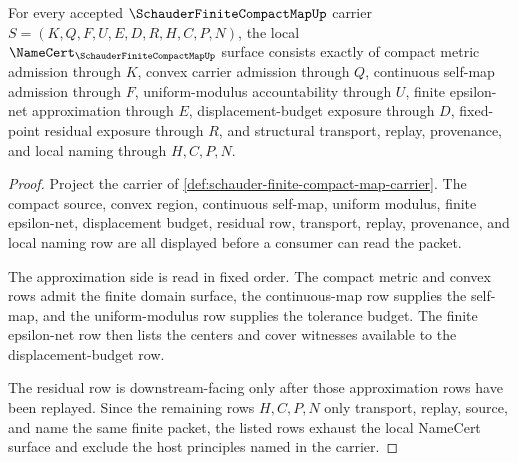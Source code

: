 \begin{theorem}
\label{thm:schauder-finite-compact-map-namecert-obligations}
For every accepted $\SchauderFiniteCompactMapUp$ carrier $S=(K,Q,F,U,E,D,R,H,C,P,N)$, the local $\NameCert_{\SchauderFiniteCompactMapUp}$ surface consists exactly of compact metric admission through $K$, convex carrier admission through $Q$, continuous self-map admission through $F$, uniform-modulus accountability through $U$, finite epsilon-net approximation through $E$, displacement-budget exposure through $D$, fixed-point residual exposure through $R$, and structural transport, replay, provenance, and local naming through $H,C,P,N$.
\end{theorem}
\begin{proof}
Project the carrier of \autoref{def:schauder-finite-compact-map-carrier}. The compact source, convex region, continuous self-map, uniform modulus, finite epsilon-net, displacement budget, residual row, transport, replay, provenance, and local naming row are all displayed before a consumer can read the packet.

The approximation side is read in fixed order. The compact metric and convex rows admit the finite domain surface, the continuous-map row supplies the self-map, and the uniform-modulus row supplies the tolerance budget. The finite epsilon-net row then lists the centers and cover witnesses available to the displacement-budget row.

The residual row is downstream-facing only after those approximation rows have been replayed. Since the remaining rows $H,C,P,N$ only transport, replay, source, and name the same finite packet, the listed rows exhaust the local NameCert surface and exclude the host principles named in the carrier.
\end{proof}

